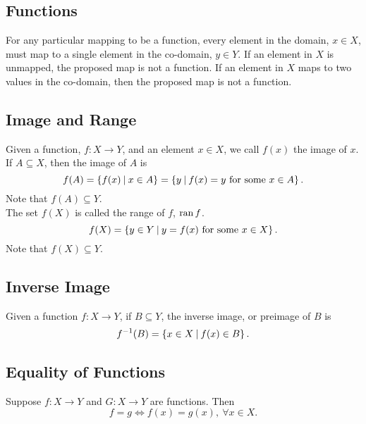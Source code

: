 \documentclass{report}
\begin{document}
\subsection*{Functions}
For any particular mapping to be a function, every element in the domain, $x\in X$, must map to a single element in the co-domain, $y\in Y$. If an element in $X$ is unmapped, the proposed map is not a function. If an element in $X$ maps to two values in the co-domain, then the proposed map is not a function.

\subsection*{Image and Range}
Given a function, $f:X\to Y$, and an element $x\in X$, we call $f(x)$ the image of $x$. If $A\subseteq X$, then the image of $A$ is
$$
	f(A) = \left\lbrace f(x)\medspace\middle|\medspace x\in A \right\rbrace = \left\lbrace y \medspace\middle|\medspace f(x)=y \text{ for some } x\in A \right\rbrace.
$$
Note that $f(A) \subseteq Y$. \\

The set $f(X)$ is called the range of $f$, $\operatorname{ran} f$.
$$
	f(X) = \left\lbrace y\in Y\medspace\middle|\medspace y= f(x) \text{ for some } x\in X \right\rbrace.
$$
Note that $f(X)\subseteq Y$. 

\subsection*{Inverse Image}
Given a function $f:X\to Y$, if $B\subseteq Y$, the inverse image, or preimage of $B$ is
$$
	f^{-1}(B) = \left\lbrace x\in X\medspace\middle|\medspace f(x)\in B \right\rbrace.
$$

\subsection*{Equality of Functions}
Suppose $f:X\to Y$ and $G:X\to Y$ are functions. Then 
$$
	f=g \iff f(x) = g(x),\ \forall x\in X.
$$
\end{document}
